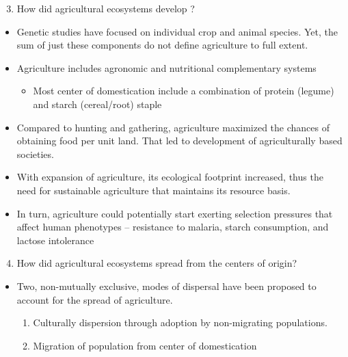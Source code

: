 \documentclass[
  ignorenonframetext,
  aspectratio=169]{beamer}
\providecommand{\tightlist}{%
  \setlength{\itemsep}{0pt}\setlength{\parskip}{0pt}}
\begin{document}
\begin{frame}{}
\protect\hypertarget{section-4}{}
\footnotesize

\begin{enumerate}[<+->]
\setcounter{enumi}{2}
\tightlist
\item
  \alert{How did agricultural ecosystems develop ?}
\end{enumerate}

\begin{itemize}[<+->]
\tightlist
\item
  Genetic studies have focused on individual crop and animal species.
  Yet, the sum of just these components do not define agriculture to
  full extent.
\item
  Agriculture includes agronomic and nutritional complementary systems

  \begin{itemize}[<+->]
  \tightlist
  \item
    Most center of domestication include a combination of protein
    (legume) and starch (cereal/root) staple
  \end{itemize}
\item
  Compared to hunting and gathering, agriculture maximized the chances
  of obtaining food per unit land. That led to development of
  agriculturally based societies.
\item
  With expansion of agriculture, its ecological footprint increased,
  thus the need for sustainable agriculture that maintains its resource
  basis.
\item
  In turn, agriculture could potentially start exerting selection
  pressures that affect human phenotypes -- resistance to malaria,
  starch consumption, and lactose intolerance
\end{itemize}

\begin{enumerate}[<+->]
\setcounter{enumi}{3}
\tightlist
\item
  \alert{How did agricultural ecosystems spread from the centers of origin?}
\end{enumerate}

\begin{itemize}[<+->]
\tightlist
\item
  Two, non-mutually exclusive, modes of dispersal have been proposed to
  account for the spread of agriculture.

  \begin{enumerate}[<+->]
  \tightlist
  \item
    Culturally dispersion through adoption by non-migrating populations.
  \item
    Migration of population from center of domestication
  \end{enumerate}
\end{itemize}
\end{frame}
\end{document}
